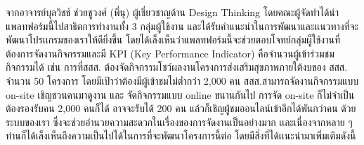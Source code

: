 จากอาจารย์บุลวิชช์ ช่วยชูวงศ์ (พี่นุ) ผู้เชี่ยวชาญด้าน Design Thinking
โดยคณะผู้จัดทำได้นำแพลทฟอร์มนี้ไปสาธิตการทำงานทั้ง 3 กลุ่มผู้ใช้งาน และได้รับคำแนะนำในการพัฒนาและเเนวทางที่จะพัฒนาโปรเเกรมของเราให้ดียิ่งขึ้น โดยได้เล็งเห็นว่าแพลทฟอร์มนี้จะช่วยตอบโจทย์กลุ่มผู็ใช้งานที่ต้องการจัดงานกิจกรรมและมี KPI (Key Performance Indicator) คือจำนวนผู้เข้าร่วมชมกิจกรรมได้ เช่น การที่สสส. ต้องจัดกิจกรรมโชว์ผลงานโครงการส่งเสริมสุขภาพภายใต้งบของ สสส. จำนวน 50 โครงการ โดยมีเป้าว่าต้องมีผู้เข้าชมไม่ต่ำกว่า 2,000 คน สสส.สามารถจัดงานกิจกรรมแบบ on-site เชิญชวนคนมาดูงาน และ
จัดกิจกรรมแบบ online ขนานกันไป การจัด on-site ก็ไม่จำเป็นต้องรองรับคน 2,000 คนก็ได้ อาจจะรับได้ 200 คน แล้วก็เชิญผู้ชมออนไลน์เข้าอีกได้พันกว่าคน ด้วยระบบของเรา ซึ่งจะช่วยอำนวยความสะดวกในเรื่องของการจัดงานเป็นอย่างมาก เเละเนื่องจากหลาย ๆ ท่านก็ได้เล็งเห็นถึงความเป็นไปได้ในการที่จะพัฒนาโครงการนี้ต่อ โดยมีสิ่งที่ได้เเนะนำมาเพิ่มเติมดังนี้
